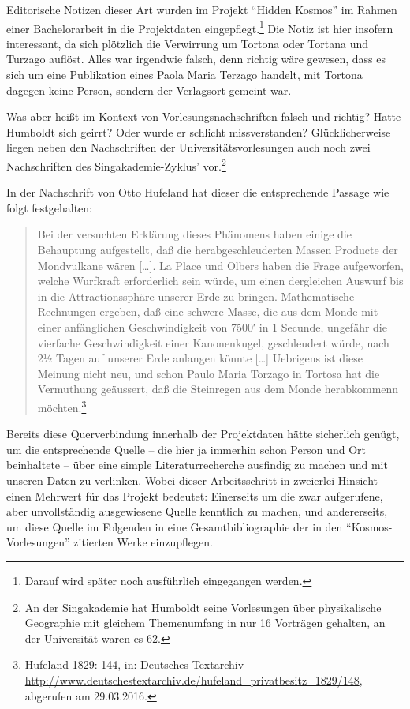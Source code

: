 \documentclass[a4paper,
fontsize=11pt,
oneside,
numbers=noperiodatend,
parskip=half-,
bibliography=totoc,
final
]{scrartcl}
\begin{document}
Editorische Notizen dieser Art wurden im Projekt \enquote{Hidden Kosmos}
im Rahmen einer Bachelorarbeit in die Projektdaten
eingepflegt.\footnote{Darauf wird später noch ausführlich eingegangen
  werden.} Die Notiz ist hier insofern interessant, da sich plötzlich
die Verwirrung um Tortona oder Tortana und Turzago auflöst. Alles war
irgendwie falsch, denn richtig wäre gewesen, dass es sich um eine
Publikation eines Paola Maria Terzago handelt, mit Tortona dagegen keine
Person, sondern der Verlagsort gemeint war.

Was aber heißt im Kontext von Vorlesungsnachschriften falsch und
richtig? Hatte Humboldt sich geirrt? Oder wurde er schlicht
missverstanden? Glücklicherweise liegen neben den Nachschriften der
Universitätsvorlesungen auch noch zwei Nachschriften des
Singakademie-Zyklus' vor.\footnote{An der Singakademie hat Humboldt
  seine Vorlesungen über physikalische Geographie mit gleichem
  Themenumfang in nur 16 Vorträgen gehalten, an der Universität waren es
  62.}

In der Nachschrift von Otto Hufeland hat dieser die entsprechende
Passage wie folgt festgehalten:

\begin{quote}
Bei der versuchten Erklärung dieses Phänomens haben einige die
Behauptung aufgestellt, daß die herabgeschleuderten Massen Producte der
Mondvulkane wären {[}\ldots{}{]}. La Place und Olbers haben die Frage
aufgeworfen, welche Wurfkraft erforderlich sein würde, um einen
dergleichen Auswurf bis in die Attractionssphäre unserer Erde zu
bringen. Mathematische Rechnungen ergeben, daß eine schwere Masse, die
aus dem Monde mit einer anfänglichen Geschwindigkeit von 7500′ in 1
Secunde, ungefähr die vierfache Geschwindigkeit einer Kanonenkugel,
geschleudert würde, nach 2½ Tagen auf unserer Erde anlangen könnte
{[}\ldots{}{]} Uebrigens ist diese Meinung nicht neu, und schon Paulo
Maria Torzago in Tortosa hat die Vermuthung geäussert, daß die
Steinregen aus dem Monde herabkommenn möchten.\footnote{Hufeland 1829:
  144, in: Deutsches Textarchiv
  \url{http://www.deutschestextarchiv.de/hufeland_privatbesitz_1829/148},
  abgerufen am 29.03.2016.}
\end{quote}

Bereits diese Querverbindung innerhalb der Projektdaten hätte sicherlich
genügt, um die entsprechende Quelle -- die hier ja immerhin schon Person
und Ort beinhaltete -- über eine simple Literaturrecherche ausfindig zu
machen und mit unseren Daten zu verlinken. Wobei dieser Arbeitsschritt
in zweierlei Hinsicht einen Mehrwert für das Projekt bedeutet:
Einerseits um die zwar aufgerufene, aber unvollständig ausgewiesene
Quelle kenntlich zu machen, und andererseits, um diese Quelle im
Folgenden in eine Gesamtbibliographie der in den
\enquote{Kosmos-Vorlesungen} zitierten Werke einzupflegen.
\end{document}
